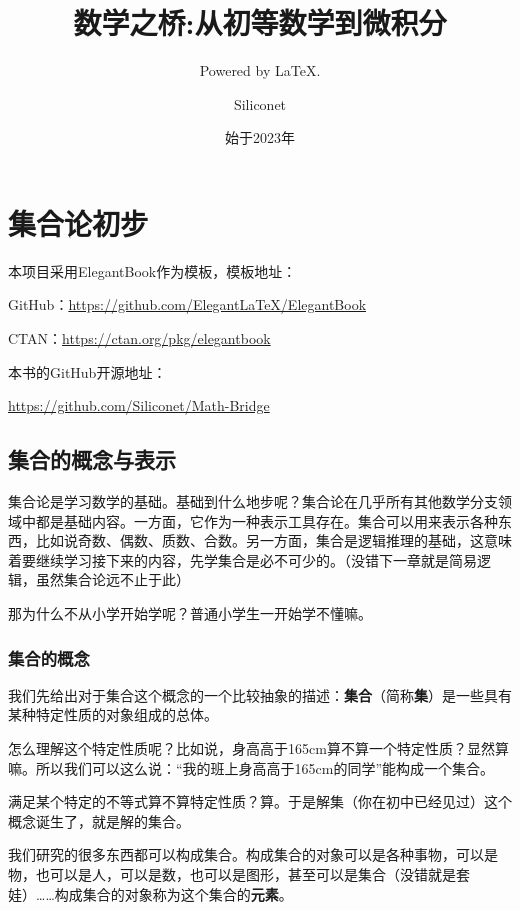 \documentclass[lang=cn,math=cm,chinesefont=nofont,11pt,scheme=chinese,onecol]{elegantbook}
\title{数学之桥:从初等数学到微积分}
\subtitle{Powered by \LaTeX.}
\author{Siliconet}
\date{始于2023年}
\begin{document}
\maketitle
\frontmatter

\tableofcontents

\mainmatter

\chapter{集合论初步}

本项目采用ElegantBook作为模板，模板地址：

GitHub：\href{https://github.com/ElegantLaTeX/ElegantBook}{https://github.com/ElegantLaTeX/ElegantBook}

CTAN：\href{https://ctan.org/pkg/elegantbook}{https://ctan.org/pkg/elegantbook}

本书的GitHub开源地址：

\href{https://github.com/Siliconet/Math-Bridge}{https://github.com/Siliconet/Math-Bridge}

\section{集合的概念与表示}
集合论是学习数学的基础。基础到什么地步呢？集合论在几乎所有其他数学分支领域中都是基础内容。一方面，它作为一种表示工具存在。集合可以用来表示各种东西，比如说奇数、偶数、质数、合数。另一方面，集合是逻辑推理的基础，这意味着要继续学习接下来的内容，先学集合是必不可少的。（没错下一章就是简易逻辑，虽然集合论远不止于此）

那为什么不从小学开始学呢？普通小学生一开始学不懂嘛。

\subsection{集合的概念}

我们先给出对于集合这个概念的一个比较抽象的描述：\textbf{集合}（简称\textbf{集}）是一些具有某种特定性质的对象组成的总体。

怎么理解这个特定性质呢？比如说，身高高于165cm算不算一个特定性质？显然算嘛。所以我们可以这么说：“我的班上身高高于165cm的同学”能构成一个集合。

满足某个特定的不等式算不算特定性质？算。于是解集（你在初中已经见过）这个概念诞生了，就是解的集合。

我们研究的很多东西都可以构成集合。构成集合的对象可以是各种事物，可以是物，也可以是人，可以是数，也可以是图形，甚至可以是集合（没错就是套娃）……构成集合的对象称为这个集合的\textbf{元素}。
\end{document}
